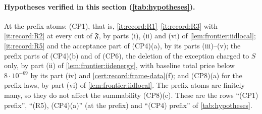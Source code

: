 \paragraph{Hypotheses verified in this section (\cref{tab:hypotheses}).}
At the prefix atoms: (CP1), that is, \ref{it:record:R1}--\ref{it:record:R3}
with \ref{it:record:R2} at every cut of $\mathfrak F$, by parts (i), (ii) and
(vi) of \cref{lem:frontier:iidlocal}; \ref{it:record:R5} and the acceptance
part of (CP4)(a), by its parts (iii)--(v); the prefix parts of (CP4)(b) and of
(CP6), the deletion of the exception charged to $S$ only, by part (ii) of
\cref{lem:frontier:iidenergy}, with baseline total price below $8\cdot10^{-69}$ by
its part (iv) and \cref{cert:record:frame-data}(f); and (CP8)(a) for the prefix
laws, by part (vi) of \cref{lem:frontier:iidlocal}. The prefix atoms are
finitely many, so they do not affect the summability (CP8)(c). These are the
rows ``(CP1) prefix'', ``(R5), (CP4)(a)'' (at the prefix) and ``(CP4) prefix''
of \cref{tab:hypotheses}.
